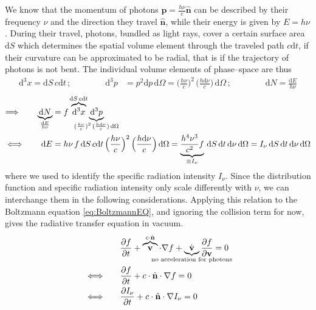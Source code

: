We know that the momentum of photons $\textbf{p} = \frac{h\nu}{c}\hat{\textbf{n}}$ can be described by their frequency $\nu$ and the direction they travel $\hat{\textbf{n}}$, while their energy is given by $E = h\nu$.
During their travel, photons, bundled as light rays, cover a certain surface area $\mathrm{d}S$ which determines the spatial volume element through the traveled path $c\mathrm{d}t$, if their curvature can be approximated to be radial, that is if the trajectory of photons is not bent.
The individual volume elements of phase--space are thus
\begin{align*}
 \mathrm{d}^{3}x = \mathrm{d}S\,c\mathrm{d}t\,; \qquad\qquad \mathrm{d}^{3}p &= p^{2}\mathrm{d}p\,\mathrm{d}\Omega = \Big(\frac{h\nu}{c}\Big)^{2}\,\Big(\frac{h\mathrm{d}\nu}{c}\Big)\,\mathrm{d}\Omega\,; \qquad\qquad \mathrm{d}N = \frac{\mathrm{d}E}{h\nu}
\end{align*}
\vspace{-0.75cm}
\begin{align*}
 \Longrightarrow\qquad
 \underbrace{\mathrm{d}N}_{\mathclap{\frac{\mathrm{d}E}{h\nu}}} &= f\,\overbrace{\mathrm{d}^{3}x}^{\mathclap{\mathrm{d}S\,c\mathrm{d}t}}\,\underbrace{\mathrm{d}^{3}p}_{\mathclap{(\frac{h\nu}{c})^{2}\,(\frac{h\mathrm{d}\nu}{c})\,\mathrm{d}\Omega}} \\
 \Longleftrightarrow\qquad
 \mathrm{d}E &= h\nu\,f\,\mathrm{d}S\,c\mathrm{d}t\,\Big(\frac{h\nu}{c}\Big)^{2}\,\Big(\frac{h\mathrm{d}\nu}{c}\Big)\,\mathrm{d}\Omega = \underbrace{\frac{h^{4}\nu^{3}}{c^{2}}f}_{\equiv I_{\nu}}\,\mathrm{d}S\,\mathrm{d}t\,\mathrm{d}\nu\,\mathrm{d}\Omega = I_{\nu}\,\mathrm{d}S\,\mathrm{d}t\,\mathrm{d}\nu\,\mathrm{d}\Omega
\end{align*}
where we used  to identify the specific radiation intensity $I_{\nu}$.
Since the distribution function and specific radiation intensity only scale differently with $\nu$, we can interchange them in the following considerations.
Applying this relation to the Boltzmann equation \eqref{eq:BoltzmannEQ}, and ignoring the collision term for now, gives the radiative transfer equation in vacuum.
\begin{align*}
 &\frac{\partial f}{\partial t} + \overbrace{\textbf{v} }^{\mathclap{c\cdot\hat{\textbf{n}}}}\cdot\nabla f + \underbrace{ \dot{\textbf{v}} }_{\mathclap{\text{no acceleration for photons}}} \frac{\partial f}{\partial \textbf{v}} = 0 \\
 \Longleftrightarrow\qquad
 &\frac{\partial f}{\partial t} + c\cdot\hat{\textbf{n}}\cdot\nabla f = 0 \\
 \Longleftrightarrow\qquad
 &\frac{\partial I_{\nu}}{\partial t} + c\cdot\hat{\textbf{n}}\cdot\nabla I_{\nu} = 0
\end{align*}
